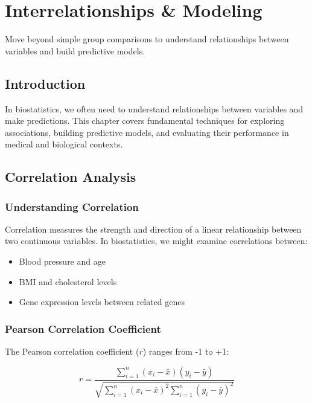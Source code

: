 \documentclass[
  11pt,
  letterpaper,
  oneside]{book}
\providecommand{\tightlist}{%
  \setlength{\itemsep}{0pt}\setlength{\parskip}{0pt}}\usepackage{longtable,booktabs,array}
\begin{document}

\chapter{Interrelationships \&
Modeling}\label{interrelationships-modeling}

Move beyond simple group comparisons to understand relationships between
variables and build predictive models.

\section{Introduction}\label{introduction}

In biostatistics, we often need to understand relationships between
variables and make predictions. This chapter covers fundamental
techniques for exploring associations, building predictive models, and
evaluating their performance in medical and biological contexts.

\section{Correlation Analysis}\label{correlation-analysis}

\subsection{Understanding Correlation}\label{understanding-correlation}

Correlation measures the strength and direction of a linear relationship
between two continuous variables. In biostatistics, we might examine
correlations between:

\begin{itemize}
\tightlist
\item
  Blood pressure and age
\item
  BMI and cholesterol levels
\item
  Gene expression levels between related genes
\end{itemize}

\subsection{Pearson Correlation
Coefficient}\label{pearson-correlation-coefficient}

The Pearson correlation coefficient (\(r\)) ranges from -1 to +1:

\[r = \frac{\sum_{i=1}^{n}(x_i - \bar{x})(y_i - \bar{y})}{\sqrt{\sum_{i=1}^{n}(x_i - \bar{x})^2 \sum_{i=1}^{n}(y_i - \bar{y})^2}}\]
\end{document}

